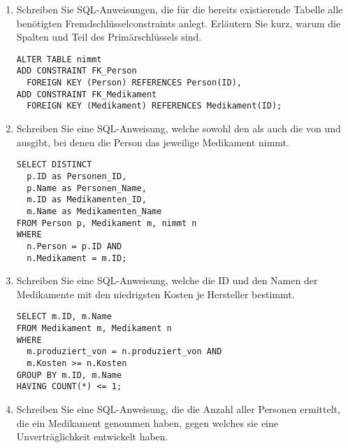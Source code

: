 \documentclass{lehramt-informatik-aufgabe}
\begin{document}
\begin{enumerate}


\item Schreiben Sie SQL-Anweisungen, die für die bereits existierende
Tabelle  alle benötigten Fremdschlüsselconstraints anlegt.
Erläutern Sie kurz, warum die Spalten  und  Teil des
Primärschlüssels sind.

\begin{liAntwort}
\begin{verbatim}
ALTER TABLE nimmt
ADD CONSTRAINT FK_Person
  FOREIGN KEY (Person) REFERENCES Person(ID),
ADD CONSTRAINT FK_Medikament
  FOREIGN KEY (Medikament) REFERENCES Medikament(ID);
\end{verbatim}
\end{liAntwort}


\item Schreiben Sie eine SQL-Anweisung, welche sowohl den  als
auch die  von  und  ausgibt, bei denen
die Person das jeweilige Medikament nimmt.

\begin{liAntwort}
\begin{verbatim}
SELECT DISTINCT
  p.ID as Personen_ID,
  p.Name as Personen_Name,
  m.ID as Medikamenten_ID,
  m.Name as Medikamenten_Name
FROM Person p, Medikament m, nimmt n
WHERE
  n.Person = p.ID AND
  n.Medikament = m.ID;
\end{verbatim}
\end{liAntwort}


\item Schreiben Sie eine SQL-Anweisung, welche die ID und den Namen der
Medikamente mit den niedrigsten Kosten je Hersteller bestimmt.

\begin{liAntwort}
\begin{verbatim}
SELECT m.ID, m.Name
FROM Medikament m, Medikament n
WHERE
  m.produziert_von = n.produziert_von AND
  m.Kosten >= n.Kosten
GROUP BY m.ID, m.Name
HAVING COUNT(*) <= 1;
\end{verbatim}
\end{liAntwort}


\item Schreiben Sie eine SQL-Anweisung, die die Anzahl aller Personen
ermittelt, die ein Medikament genommen haben, gegen welches sie eine
Unverträglichkeit entwickelt haben.


\end{enumerate}
\end{document}
